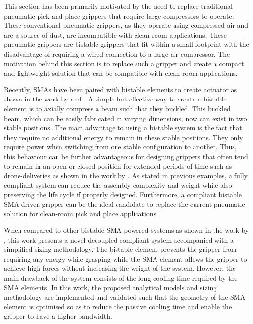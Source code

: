 This section has been primarily motivated by the need to replace traditional pneumatic pick and place grippers that require large compressors to operate. These conventional pneumatic grippers, as they operate using compressed air and are a source of dust, are incompatible with clean-room applications. These pneumatic grippers are bistable grippers that fit within a small footprint with the disadvantage of requiring a wired connection to a large air compressor. The motivation behind this section is to replace such a gripper and create a compact and lightweight solution that can be compatible with clean-room applications.

Recently, SMAs have been paired with bistable elements to create actuator as shown in the work by \cite{meng_mechanically_2020} and \cite{scholtesDesignCompliantIndustrial2020a}. A simple but effective way to create a bistable element is to axially compress a beam such that they buckled. This buckled beam, which can be easily fabricated in varying dimensions, now can exist in two stable positions. The main advantage to using a bistable system is the fact that they require no additional energy to remain in these stable positions. They only require power when switching from one stable configuration to another. Thus, this behaviour can be further advantageous for designing grippers that often tend to remain in an open or closed position for extended periods of time such as drone-deliveries as shown in the work by \cite{zhangCompliantBistableGrippers2020}. As stated in previous examples, a fully compliant system can reduce the assembly complexity and weight while also preserving the life cycle if properly designed. Furthermore, a compliant bistable SMA-driven gripper can be the ideal candidate to replace the current pneumatic solution for clean-room pick and place applications.

When compared to other bistable SMA-powered systems as shown in the work by \cite{scholtesDevelopmentBistableSMA2021}, this work presents a novel decoupled compliant system accompanied with a simplified sizing methodology. The bistable element prevents the gripper from requiring any energy while grasping while the SMA element allows the gripper to achieve high forces without increasing the weight of the system. However, the main drawback of the system consists of the long cooling time required by the SMA elements. In this work, the proposed analytical models and sizing methodology are implemented and validated such that the geometry of the SMA element is optimised so as to reduce the passive cooling time and enable the gripper to have a higher bandwidth.

